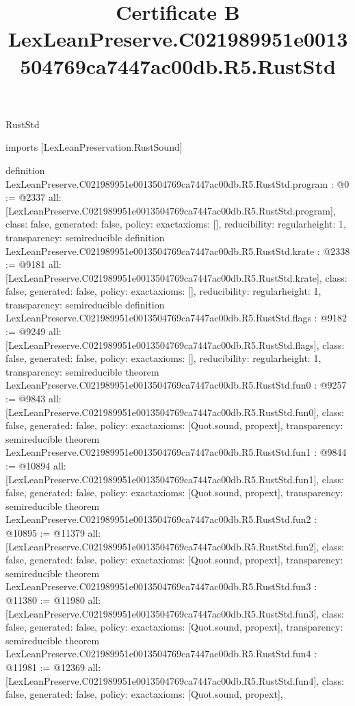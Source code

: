\begin{lexlean}{RustStd}
\title{Certificate B LexLeanPreserve.C021989951e0013504769ca7447ac00db.R5.RustStd}
\begin{coremodule}
imports [LexLeanPreservation.RustSound]

definition LexLeanPreserve.C021989951e0013504769ca7447ac00db.R5.RustStd.program : @0 := @2337 {
  all: [LexLeanPreserve.C021989951e0013504769ca7447ac00db.R5.RustStd.program],
  class: false,
  generated: false,
  policy: exact{axioms: []},
  reducibility: regular{height: 1},
  transparency: semireducible
}
definition LexLeanPreserve.C021989951e0013504769ca7447ac00db.R5.RustStd.krate : @2338 := @9181 {
  all: [LexLeanPreserve.C021989951e0013504769ca7447ac00db.R5.RustStd.krate],
  class: false,
  generated: false,
  policy: exact{axioms: []},
  reducibility: regular{height: 1},
  transparency: semireducible
}
definition LexLeanPreserve.C021989951e0013504769ca7447ac00db.R5.RustStd.flags : @9182 := @9249 {
  all: [LexLeanPreserve.C021989951e0013504769ca7447ac00db.R5.RustStd.flags],
  class: false,
  generated: false,
  policy: exact{axioms: []},
  reducibility: regular{height: 1},
  transparency: semireducible
}
theorem LexLeanPreserve.C021989951e0013504769ca7447ac00db.R5.RustStd.fun0 : @9257 := @9843 {
  all: [LexLeanPreserve.C021989951e0013504769ca7447ac00db.R5.RustStd.fun0],
  class: false,
  generated: false,
  policy: exact{axioms: [Quot.sound, propext]},
  transparency: semireducible
}
theorem LexLeanPreserve.C021989951e0013504769ca7447ac00db.R5.RustStd.fun1 : @9844 := @10894 {
  all: [LexLeanPreserve.C021989951e0013504769ca7447ac00db.R5.RustStd.fun1],
  class: false,
  generated: false,
  policy: exact{axioms: [Quot.sound, propext]},
  transparency: semireducible
}
theorem LexLeanPreserve.C021989951e0013504769ca7447ac00db.R5.RustStd.fun2 : @10895 := @11379 {
  all: [LexLeanPreserve.C021989951e0013504769ca7447ac00db.R5.RustStd.fun2],
  class: false,
  generated: false,
  policy: exact{axioms: [Quot.sound, propext]},
  transparency: semireducible
}
theorem LexLeanPreserve.C021989951e0013504769ca7447ac00db.R5.RustStd.fun3 : @11380 := @11980 {
  all: [LexLeanPreserve.C021989951e0013504769ca7447ac00db.R5.RustStd.fun3],
  class: false,
  generated: false,
  policy: exact{axioms: [Quot.sound, propext]},
  transparency: semireducible
}
theorem LexLeanPreserve.C021989951e0013504769ca7447ac00db.R5.RustStd.fun4 : @11981 := @12369 {
  all: [LexLeanPreserve.C021989951e0013504769ca7447ac00db.R5.RustStd.fun4],
  class: false,
  generated: false,
  policy: exact{axioms: [Quot.sound, propext]},
}
\end{coremodule}
\end{lexlean}

